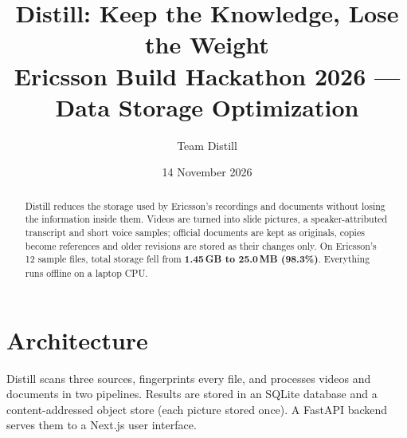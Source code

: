 \documentclass[11pt,a4paper]{article}
\title{\textbf{Distill}: Keep the Knowledge, Lose the Weight\\[4pt]
\large Ericsson Build Hackathon 2026 --- Data Storage Optimization}
\author{Team Distill}
\date{14 November 2026}
\begin{document}
\maketitle

\begin{abstract}
Distill reduces the storage used by Ericsson's recordings and documents without losing the information inside them.
Videos are turned into slide pictures, a speaker-attributed transcript and short voice samples; official documents are kept as originals,
copies become references and older revisions are stored as their changes only.
On Ericsson's 12 sample files, total storage fell from \textbf{1.45\,GB to 25.0\,MB (98.3\%)}.
Everything runs offline on a laptop CPU.
\end{abstract}

\section{Architecture}

Distill scans three sources, fingerprints every file, and processes videos and documents in two pipelines.
Results are stored in an SQLite database and a content-addressed object store (each picture stored once).
A FastAPI backend serves them to a Next.js user interface.
\end{document}
